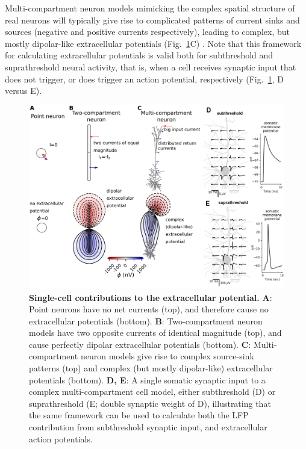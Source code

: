 \documentclass[preprint,11pt,authoryear]{elsarticle}
\begin{document}
\begin{itemize}
\begin{itemize}
Multi-compartment neuron models mimicking the complex spatial structure of real neurons will typically give rise to complicated patterns of current sinks and sources (negative and positive currents respectively), leading to complex, but mostly dipolar-like extracellular potentials (Fig.~\ref{fig:EP_morph}C) \citep{Einevoll2013}.
Note that this framework for calculating extracellular potentials is valid both for subthreshold and suprathreshold neural activity, that is, when a cell receives synaptic input that does not trigger, or does trigger an action potential, respectively (Fig.~\ref{fig:EP_morph}, D versus E).

\begin{figure}[!ht]
\begin{center}
\includegraphics[width=1\textwidth]{single_cell_EP}
\end{center}
\caption{\textbf{Single-cell contributions to the extracellular potential.} 
{\bf A}: Point neurons have no net currents (top), and therefore cause no extracellular potentials (bottom). 
{\bf B}: Two-compartment neuron models have two opposite currents
of identical magnitude (top), and cause perfectly dipolar extracellular potentials (bottom). 
{\bf C}: Multi-compartment neuron models \citep{Hay2011} give rise to complex source-sink patterns (top) and complex (but mostly dipolar-like) extracellular potentials (bottom). 
{\bf D, E}: A single somatic synaptic input to a complex multi-compartment cell model, either subthreshold (D) or suprathreshold (E; double synaptic weight of D), illustrating that the same framework can be used to calculate both the LFP contribution from subthreshold synaptic input, and extracellular action potentials. 
}
\label{fig:EP_morph}
\end{figure}


\end{itemize}
\end{itemize}
\end{document}

